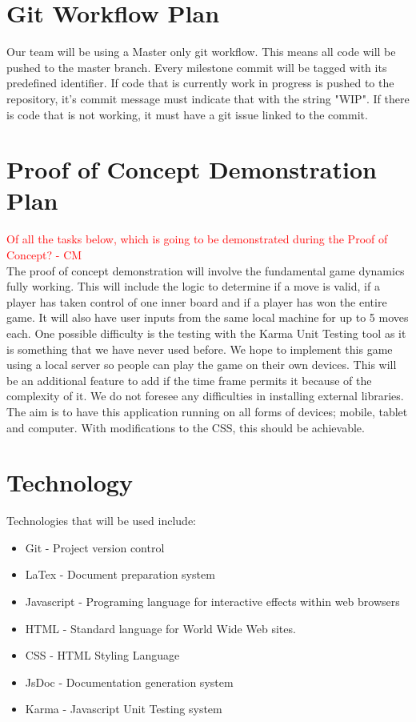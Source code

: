 \documentclass{article}
\begin{document}
\section{Git Workflow Plan}
Our team will be using a Master only git workflow.
This means all code will be pushed to the master branch. Every milestone commit
will be tagged with its predefined identifier. If code that is currently work in
progress is pushed to the repository, it's commit message must indicate that with the
string "WIP". If there is code that is not working, it must have a git issue
linked to the commit.

\section{Proof of Concept Demonstration Plan}
\textcolor{red}{ Of all the tasks below, which is going to be demonstrated during the Proof of Concept? - CM} \\
The proof of concept demonstration will involve the fundamental game dynamics
fully working. This will include the logic to determine if a move is valid, if a
player has taken control of one inner board and if a player has won the entire
game. It will also have user inputs from the same local machine for up to 5
moves each. One possible difficulty is the testing with the Karma Unit Testing
tool as it is something that we have never used before. We hope to implement
this game using a local server so people can play the game on their own devices.
This will be an additional feature to add if the time frame permits it because
of the complexity of it. We do not foresee any difficulties in installing
external libraries. The aim is to have this application running on all forms of
devices; mobile, tablet and computer. With modifications to the CSS, this should
be achievable.

\section{Technology}
Technologies that will be used include:

\begin{itemize}

  \item Git - Project version control
  \item LaTex - Document preparation system
  \item Javascript - Programing language for interactive effects within web browsers
  \item HTML - Standard language for World Wide Web sites.
  \item CSS - HTML Styling Language 
  \item JsDoc - Documentation generation system
  \item Karma - Javascript Unit Testing system 

\end{itemize}
\end{document}
